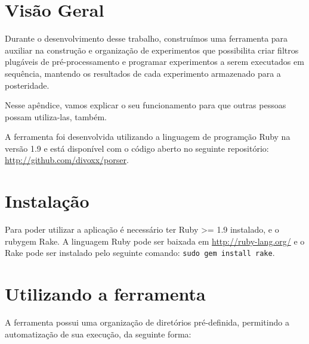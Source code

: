\section{Visão Geral}

Durante o desenvolvimento desse trabalho, construímos uma ferramenta para auxiliar na construção e organização de experimentos que possibilita criar filtros plugáveis de pré-processamento e programar experimentos a serem executados em sequência, mantendo os resultados de cada experimento armazenado para a posteridade.

Nesse apêndice, vamos explicar o seu funcionamento para que outras pessoas possam utiliza-las, também.

A ferramenta foi desenvolvida utilizando a linguagem de programção Ruby na versão 1.9 e está disponível com o código aberto no seguinte repositório: \url{http://github.com/divoxx/porser}.

\section{Instalação}

Para poder utilizar a aplicação é necessário ter Ruby >= 1.9 instalado, e o rubygem Rake. A linguagem Ruby pode ser baixada em \url{http://ruby-lang.org/} e o Rake pode ser instalado pelo seguinte comando: \verb|sudo gem install rake|.

\section{Utilizando a ferramenta}

A ferramenta possui uma organização de diretórios pré-definida, permitindo a automatização de sua execução, da seguinte forma:

